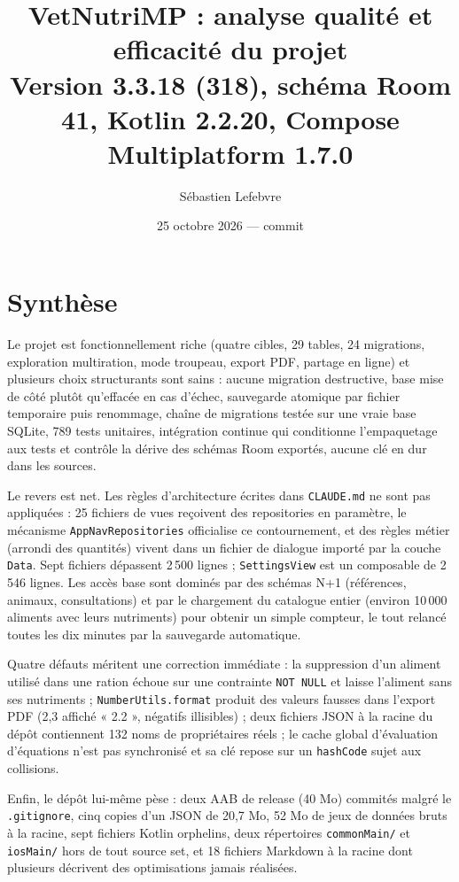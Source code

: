\documentclass[11pt,a4paper]{article}
\title{VetNutriMP : analyse qualité et efficacité du projet\\
  \large Version 3.3.18 (318), schéma Room 41, Kotlin 2.2.20, Compose Multiplatform 1.7.0}
\author{Sébastien Lefebvre}
\date{25 octobre 2026 --- commit \code{24b85e7}}
\newcommand{\fichier}[1]{\texttt{\small #1}}
\newcommand{\code}[1]{\texttt{#1}}
\begin{document}
\maketitle

\section*{Synthèse}

Le projet est fonctionnellement riche (quatre cibles, 29 tables, 24 migrations, exploration
multiration, mode troupeau, export PDF, partage en ligne) et plusieurs choix structurants sont
sains : aucune migration destructive, base mise de côté plutôt qu'effacée en cas d'échec,
sauvegarde atomique par fichier temporaire puis renommage, chaîne de migrations testée sur une
vraie base SQLite, 789 tests unitaires, intégration continue qui conditionne l'empaquetage aux
tests et contrôle la dérive des schémas Room exportés, aucune clé en dur dans les sources.

Le revers est net. Les règles d'architecture écrites dans \fichier{CLAUDE.md} ne sont pas
appliquées : 25 fichiers de vues reçoivent des repositories en paramètre, le mécanisme
\code{AppNavRepositories} officialise ce contournement, et des règles métier (arrondi des
quantités) vivent dans un fichier de dialogue importé par la couche \code{Data}. Sept fichiers
dépassent 2\,500 lignes ; \code{SettingsView} est un composable de 2\,546 lignes. Les accès base
sont dominés par des schémas N+1 (références, animaux, consultations) et par le chargement du
catalogue entier (environ 10\,000 aliments avec leurs nutriments) pour obtenir un simple compteur,
le tout relancé toutes les dix minutes par la sauvegarde automatique.

Quatre défauts méritent une correction immédiate : la suppression d'un aliment utilisé dans une
ration échoue sur une contrainte \code{NOT NULL} et laisse l'aliment sans ses nutriments ;
\code{NumberUtils.format} produit des valeurs fausses dans l'export PDF (2,3 affiché « 2.2 »,
négatifs illisibles) ; deux fichiers JSON à la racine du dépôt contiennent 132 noms de
propriétaires réels ; le cache global d'évaluation d'équations n'est pas synchronisé et sa clé
repose sur un \code{hashCode} sujet aux collisions.

Enfin, le dépôt lui-même pèse : deux AAB de release (40 Mo) commités malgré le \fichier{.gitignore},
cinq copies d'un JSON de 20,7 Mo, 52 Mo de jeux de données bruts à la racine, sept fichiers
Kotlin orphelins, deux répertoires \fichier{commonMain/} et \fichier{iosMain/} hors de tout source
set, et 18 fichiers Markdown à la racine dont plusieurs décrivent des optimisations jamais
réalisées.
\end{document}
